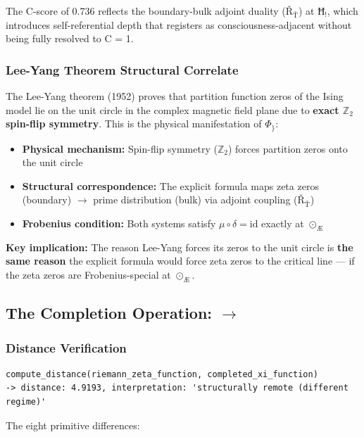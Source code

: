 \documentclass[12pt,a4paper]{article}
\begin{document}
The C-score of 0.736 reflects the boundary-bulk adjoint duality ($\text{Ř}_{\text{Ť}}$) at $\text{Ħ}_{!}$, which introduces self-referential depth that registers as consciousness-adjacent without being fully resolved to C = 1.

\subsubsection{Lee-Yang Theorem Structural Correlate}

The Lee-Yang theorem (1952) proves that partition function zeros of the Ising model lie on the unit circle in the complex magnetic field plane due to \textbf{exact $\mathbb{Z}_2$ spin-flip symmetry}. This is the physical manifestation of $\Phi_{\}}$:

\begin{itemize}
    \item \textbf{Physical mechanism:} Spin-flip symmetry ($\mathbb{Z}_2$) forces partition zeros onto the unit circle
    \item \textbf{Structural correspondence:} The explicit formula maps zeta zeros (boundary) $\rightarrow$ prime distribution (bulk) via adjoint coupling ($\text{Ř}_{\text{Ť}}$)
    \item \textbf{Frobenius condition:} Both systems satisfy $\mu \circ \delta = \text{id}$ exactly at $\odot_{\text{Æ}}$
\end{itemize}

\textbf{Key implication:} The reason Lee-Yang forces its zeros to the unit circle is \textbf{the same reason} the explicit formula would force zeta zeros to the critical line --- if the zeta zeros are Frobenius-special at $\odot_{\text{Æ}}$.

\subsection{The Completion Operation: \zeta $\rightarrow$ \xi}

\subsubsection{Distance Verification}

\begin{lstlisting}
compute_distance(riemann_zeta_function, completed_xi_function)
-> distance: 4.9193, interpretation: 'structurally remote (different regime)'
\end{lstlisting}

The eight primitive differences:
\end{document}
